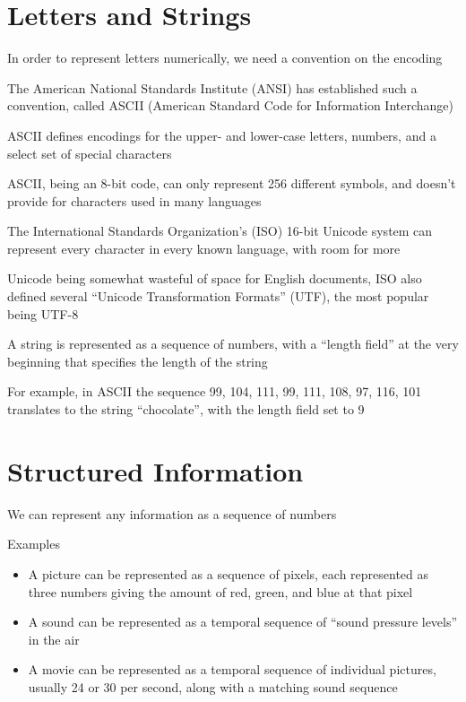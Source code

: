 \documentclass[8pt,a4paper,compress]{beamer}
\begin{document}
\section{Letters and Strings}
\begin{frame}[fragile]
In order to represent letters numerically, we need a convention on the encoding

\bigskip

The American National Standards Institute (ANSI) has established such a convention, called ASCII (American Standard Code for Information Interchange)

\bigskip

ASCII defines encodings for the upper- and lower-case letters, numbers, and a select set of special characters

\bigskip

ASCII, being an 8-bit code, can only represent 256 different symbols, and doesn't provide for characters used in many languages

\bigskip

The International Standards Organization's (ISO) 16-bit Unicode system can represent every character in every known language, with room for more

\bigskip

Unicode being somewhat wasteful of space for English documents, ISO also defined several ``Unicode Transformation Formats'' (UTF), the most popular being UTF-8 
\end{frame}

\begin{frame}[fragile]
A string is represented as a sequence of numbers, with a ``length field'' at the very beginning that specifies the length of the string

\bigskip

For example, in ASCII the sequence 99, 104, 111, 99, 111, 108, 97, 116, 101 translates to the string ``chocolate'', with the length field set to 9
\end{frame}

\section{Structured Information}
\begin{frame}[fragile]
We can represent any information as a sequence of numbers

\bigskip

Examples
\begin{itemize}
\item A picture can be represented as a sequence of pixels, each represented as three numbers giving the amount of red, green, and blue at that pixel

\item A sound can be represented as a temporal sequence of ``sound pressure levels'' in the air

\item A movie can be represented as a temporal sequence of individual pictures, usually 24 or 30 per second, along with a matching sound sequence
\end{itemize}
\end{frame}
\end{document}
